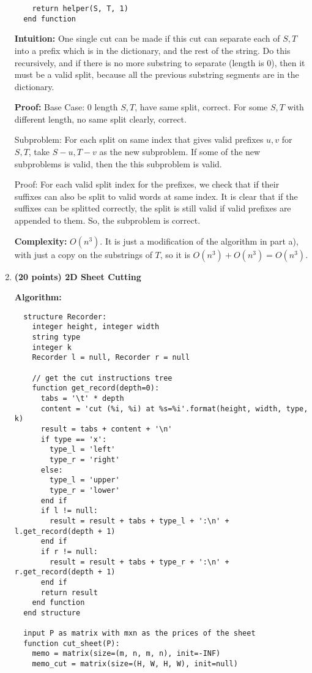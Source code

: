\documentclass{article}
\newcounter{problem}
\begin{document}
\begin{enumerate}[topsep=0pt]
\begin{verbatim}
    return helper(S, T, 1)
  end function
\end{verbatim}

\textbf{Intuition:}
One single cut can be made if this cut can separate each of $S,T$ into a prefix which is in the dictionary,
and the rest of the string.
Do this recursively, and if there is no more substring to separate (length is 0),
then it must be a valid split, because all the previous substring segments are in the dictionary.

\textbf{Proof:}
Base Case: 0 length $S,T$, have same split, correct.
For some $S,T$ with different length, no same split clearly, correct.

Subproblem: For each split on same index that gives valid prefixes $u,v$ for $S,T$, take $S-u,T-v$ as the new subproblem.
If some of the new subproblems is valid, then the this subproblem is valid.

Proof: For each valid split index for the prefixes, 
we check that if their suffixes can also be split to valid words at same index.
It is clear that if the suffixes can be splitted correctly,
the split is still valid if valid prefixes are appended to them.
So, the subproblem is correct.

\textbf{Complexity:}
$O(n^3)$. It is just a modification of the algorithm in part a), with just a copy on the substrings of $T$,
so it is $O(n^3)+O(n^3)=O(n^3)$.

\item \textbf{(20 points) 2D Sheet Cutting} 

\textbf{Algorithm:}
\begin{verbatim}
  structure Recorder:
    integer height, integer width
    string type
    integer k
    Recorder l = null, Recorder r = null

    // get the cut instructions tree
    function get_record(depth=0):
      tabs = '\t' * depth
      content = 'cut (%i, %i) at %s=%i'.format(height, width, type, k)
      result = tabs + content + '\n'
      if type == 'x':
        type_l = 'left'
        type_r = 'right'
      else:
        type_l = 'upper'
        type_r = 'lower'
      end if
      if l != null:
        result = result + tabs + type_l + ':\n' + l.get_record(depth + 1)
      end if
      if r != null:
        result = result + tabs + type_r + ':\n' + r.get_record(depth + 1)
      end if
      return result
    end function
  end structure

  input P as matrix with mxn as the prices of the sheet
  function cut_sheet(P):
    memo = matrix(size=(m, n, m, n), init=-INF)
    memo_cut = matrix(size=(H, W, H, W), init=null)


\end{verbatim}
\end{enumerate}
\end{document}
